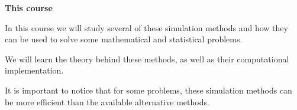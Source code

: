 \documentclass{beamer}
\begin{document}
\frame
{

{\bf This course}
\vspace{2mm}

In this course we will study several of these simulation methods 
and how they can be used to solve some mathematical and statistical problems.
\vspace{2mm}

We will learn the theory behind these methods, as well as their computational implementation.
\vspace{2mm}

It is important to notice that for some problems, these simulation methods can be more efficient than the available alternative methods. 

}
\end{document}
